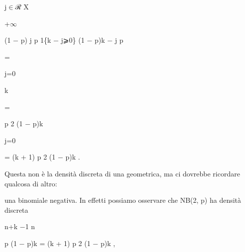 \documentclass[a4paper,portrait,12pt]{article}
\begin{document}
\begin{flushleft}
j$\in$ℛ X
\end{flushleft}


+$\infty$





\begin{flushleft}
(1 $-$ p) j p 1\{k $-$ j⩾0\} (1 $-$ p)k $-$ j p
\end{flushleft}





=


\begin{flushleft}
j=0
\end{flushleft}


\begin{flushleft}
k
\end{flushleft}





=





\begin{flushleft}
p 2 (1 $-$ p)k
\end{flushleft}





\begin{flushleft}
j=0
\end{flushleft}





\begin{flushleft}
= (k + 1) p 2 (1 $-$ p)k .
\end{flushleft}


\begin{flushleft}
Questa non \`{e} la densit\`{a} discreta di una geometrica, ma ci dovrebbe ricordare qualcosa di altro:
\end{flushleft}


\begin{flushleft}
una binomiale negativa. In effetti possiamo osservare che NB(2, p) ha densit\`{a} discreta
\end{flushleft}


\begin{flushleft}
n+k $-$1 n
\end{flushleft}


\begin{flushleft}
p (1 $-$ p)k = (k + 1) p 2 (1 $-$ p)k ,
\end{flushleft}
\end{document}
